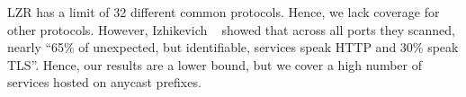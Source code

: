 LZR has a limit of 32 different common protocols.
Hence, we lack coverage for other protocols. %
However, Izhikevich \etal~\cite{lzr} showed that across all ports they scanned, nearly ``65\% of unexpected, but identifiable, services speak HTTP and 30\% speak TLS''. %
Hence, our results are a lower bound, but we cover a high number of services hosted on anycast prefixes. %
